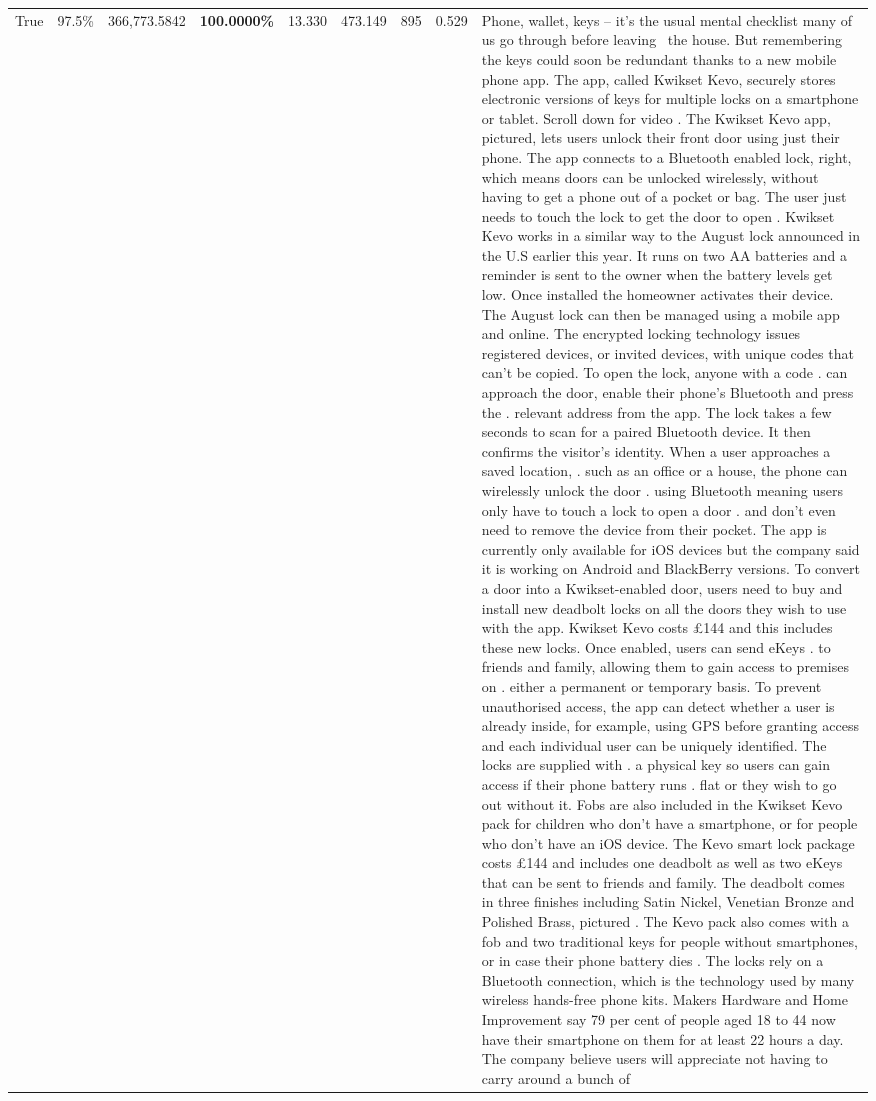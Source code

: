\begin{table}[H]
\begin{tabular}{lllrlllll}
True & 97.5\% & 366,773.5842 & \bfseries \color{red} 100.0000\% & 13.330 & 473.149 & 895 & 0.529 & Phone, wallet, keys – it’s the usual mental checklist many of us go through before leaving  the house. But remembering the keys could soon be redundant thanks to a new mobile phone app. The app, called Kwikset Kevo, securely stores electronic versions of keys for multiple locks on a smartphone or tablet. Scroll down for video . The Kwikset Kevo app, pictured, lets users unlock their front door using just their phone. The app connects to a Bluetooth enabled lock, right, which means doors can be unlocked wirelessly, without having to get a phone out of a pocket or bag. The user just needs to touch the lock to get the door to open . Kwikset Kevo works in a similar way to the August lock announced in the U.S earlier this year. It runs on two AA batteries and a reminder is sent to the owner when the battery levels get low. Once installed the homeowner activates their device. The August lock can then be managed using a mobile app and online. The encrypted locking technology issues registered devices, or invited devices, with unique codes that can't be copied. To open the lock, anyone with a code . can approach the door, enable their phone's Bluetooth and press the . relevant address from the app. The lock takes a few seconds to scan for a paired Bluetooth device. It then confirms the visitor's identity. When a user approaches a saved location, . such as an office or a house, the phone can wirelessly unlock the door . using Bluetooth meaning users only have to touch a lock to open a door . and don't even need to remove the device from their pocket. The app is currently only available for iOS devices but the company said it is working on Android and BlackBerry versions. To convert a door into a Kwikset-enabled door, users need to buy and install new deadbolt locks on all the doors they wish to use with the app. Kwikset Kevo costs £144 and this includes these new locks. Once enabled, users can send eKeys . to friends and family, allowing them to gain access to premises on . either a permanent or temporary basis. To prevent unauthorised access, the app can detect whether a user is already inside, for example, using GPS before granting access and each individual user can be uniquely identified. The locks are supplied with . a physical key so users can gain access if their phone battery runs . flat or they wish to go out without it. Fobs are also included in the Kwikset Kevo pack for children who don't have a smartphone, or for people who don't have an iOS device. The Kevo smart lock package costs £144 and includes one deadbolt as well as two eKeys that can be sent to friends and family. The deadbolt comes in three finishes including Satin Nickel, Venetian Bronze and Polished Brass, pictured . The Kevo pack also comes with a fob and two traditional keys for people without smartphones, or in case their phone battery dies . The locks rely on a Bluetooth connection, which is the technology used by many wireless hands-free phone kits. Makers Hardware and Home Improvement say 79 per cent of people aged 18 to 44 now have their smartphone on them for at least 22 hours a day. The company believe users will appreciate not having to carry around a bunch of 
\end{tabular}
\end{table}
